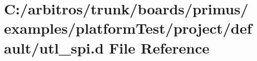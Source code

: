 \hypertarget{boards_2primus_2examples_2platform_test_2project_2default_2utl__spi_8d}{\section{C\-:/arbitros/trunk/boards/primus/examples/platform\-Test/project/default/utl\-\_\-spi.d File Reference}
\label{boards_2primus_2examples_2platform_test_2project_2default_2utl__spi_8d}
}
